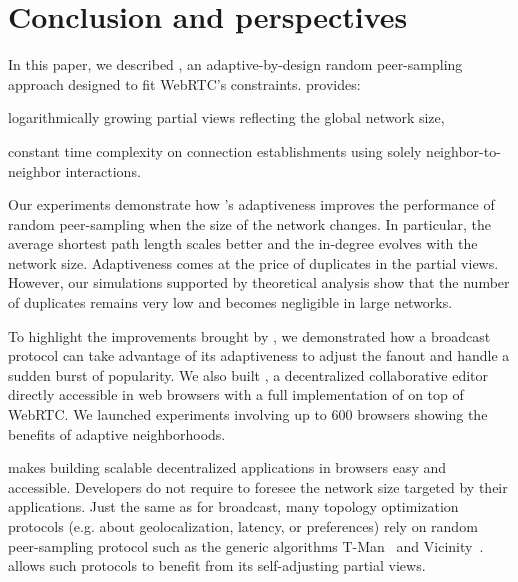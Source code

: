
\section{Conclusion and perspectives}
\label{sec:conclusion}



In this paper, we described \SPRAY, an adaptive-by-design random peer-sampling
approach designed to fit WebRTC's constraints.  \SPRAY provides:
\begin{inparaenum}[(i)]
\item logarithmically growing partial views reflecting the global network size,
\item constant time complexity on connection establishments using solely
  neighbor-to-neighbor interactions.
\end{inparaenum}
Our experiments demonstrate how \SPRAY's adaptiveness improves the performance
of random peer-sampling when the size of the network changes. In particular, the
average shortest path length scales better and the in-degree evolves with the
network size.
Adaptiveness comes at the price of duplicates in the partial views. However, our
simulations supported by theoretical analysis show that the number of duplicates
remains very low and becomes negligible in large networks.

To highlight the improvements brought by \SPRAY, we demonstrated how a
broadcast protocol can take advantage of its adaptiveness to adjust
the fanout and handle a sudden burst of popularity. We also built
\CRATE, a decentralized collaborative editor directly accessible in
web browsers with a full implementation of \SPRAY on top of WebRTC. We
launched experiments involving up to 600 browsers showing the %
benefits of adaptive neighborhoods.

\SPRAY makes building scalable decentralized applications in browsers
easy and accessible.  Developers do not require to foresee the network
size targeted by their applications. Just the same as for broadcast,
many topology optimization protocols (e.g. about geolocalization,
latency, or preferences) rely on random peer-sampling protocol such as
the generic algorithms T-Man~\cite{jelasity2009tman} and
Vicinity~\cite{voulgaris2005epidemic}. \SPRAY allows such protocols to
benefit from its self-adjusting partial views.

